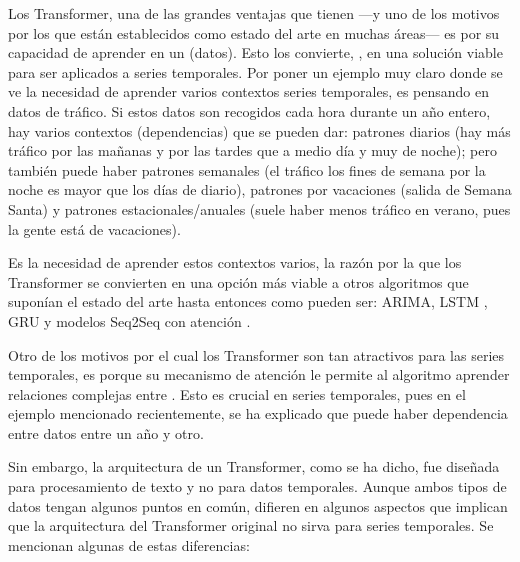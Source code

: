 {Los Transformer, una de las grandes ventajas que tienen ---y uno de los motivos por los que están establecidos como estado del arte en muchas áreas--- es por su capacidad de aprender  en un  (datos). Esto los convierte, , en una solución viable para ser aplicados a series temporales. Por poner un ejemplo muy claro donde se ve la necesidad de aprender varios contextos series temporales, es pensando en datos de tráfico. Si estos datos son recogidos cada hora durante un año entero, hay varios contextos (dependencias) que se pueden dar: patrones diarios (hay más tráfico por las mañanas y por las tardes que a medio día y muy de noche); pero también puede haber patrones semanales (el tráfico los fines de semana por la noche es mayor que los días de diario), patrones por vacaciones (salida de Semana Santa) y patrones estacionales/anuales (suele haber menos tráfico en verano, pues la gente está de vacaciones). 

Es la necesidad de aprender estos contextos varios, la razón por la que los Transformer se convierten en una opción más viable a otros algoritmos que suponían el estado del arte hasta entonces \parencite{learnablePosB} como pueden ser: ARIMA\parencite{ARIMA}, LSTM \parencite{lstm}, GRU \parencite{gru} y modelos Seq2Seq con atención \parencite{rnnPlusAttention} .

Otro de los motivos por el cual los Transformer son tan atractivos para las series temporales, es porque su mecanismo de atención le permite al algoritmo aprender relaciones complejas entre . Esto es crucial en series temporales, pues en el ejemplo mencionado recientemente, se ha explicado que puede haber dependencia entre datos entre un año y otro.

Sin embargo, la arquitectura  de un Transformer, como se ha dicho, fue diseñada para procesamiento de texto y no para datos temporales. Aunque ambos tipos de datos tengan algunos puntos en común, difieren en algunos aspectos que implican que la arquitectura del Transformer original \parencite{transformers} no sirva para series temporales. Se mencionan algunas de estas diferencias:

}
